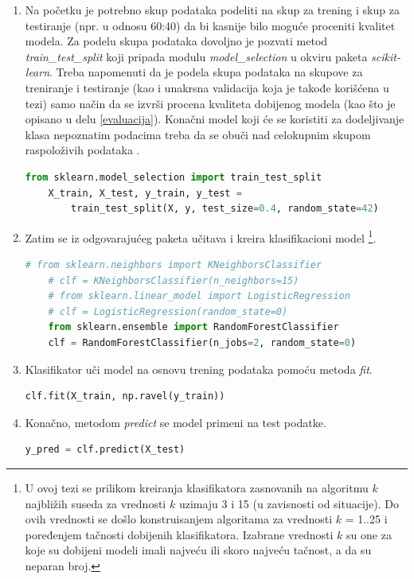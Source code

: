\documentclass[12pt,oneside]{memoir}
\begin{document}
\begin{enumerate}

\item Na početku je potrebno skup podataka podeliti na skup za trening i skup za testiranje (npr. u odnosu 60:40) da bi kasnije bilo moguće proceniti kvalitet modela. Za podelu skupa podataka dovoljno je pozvati metod \textit{train\_test\_split} koji pripada modulu \textit{model\_selection} u okviru paketa \textit{scikit-learn}. Treba napomenuti da je podela skupa podataka na skupove za treniranje i testiranje (kao i unakrsna validacija koja je takođe korišćena u tezi) samo način da se izvrši procena kvaliteta dobijenog modela (kao što je opisano u delu \ref{evaluacija}). Konačni model koji će se koristiti za dodeljivanje klasa nepoznatim podacima treba da se obuči nad celokupnim skupom raspoloživih podataka \cite{mladen}.

\begin{lstlisting}[language=Python, basicstyle=\tiny]
	from sklearn.model_selection import train_test_split
	X_train, X_test, y_train, y_test = 
		train_test_split(X, y, test_size=0.4, random_state=42)
\end{lstlisting}

\item Zatim se iz odgovarajućeg paketa učitava i kreira klasifikacioni model \footnote{U ovoj tezi se prilikom kreiranja klasifikatora zasnovanih na algoritmu $k$ najbližih suseda za vrednosti $k$ uzimaju 3 i 15 (u zavisnosti od situacije). Do ovih vrednosti se došlo konstruisanjem algoritama za vrednosti $k$ = 1..25 i poređenjem tačnosti dobijenih klasifikatora. Izabrane vrednosti $k$ su one za koje su dobijeni modeli imali najveću ili skoro najveću tačnost, a da su neparan broj.}. 
\begin{lstlisting}[language=Python, basicstyle=\tiny]
	# from sklearn.neighbors import KNeighborsClassifier
	# clf = KNeighborsClassifier(n_neighbors=15)
	# from sklearn.linear_model import LogisticRegression
	# clf = LogisticRegression(random_state=0)
	from sklearn.ensemble import RandomForestClassifier
	clf = RandomForestClassifier(n_jobs=2, random_state=0)
\end{lstlisting}

\item Klasifikator uči model na osnovu trening podataka pomoću metoda \textit{fit}. 
\begin{lstlisting}[language=Python, basicstyle=\tiny]
	clf.fit(X_train, np.ravel(y_train))
\end{lstlisting}

\item Konačno, metodom \textit{predict} se model primeni na test podatke.
\begin{lstlisting}[language=Python, basicstyle=\tiny]
	y_pred = clf.predict(X_test)
\end{lstlisting}

\end{enumerate}
\end{document}
